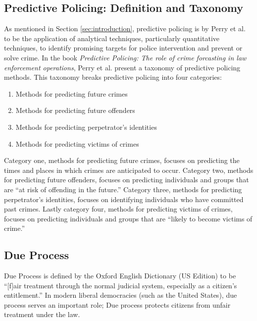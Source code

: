 \documentclass[12pt]{article} %
\newcommand{\hlfixme}[1]{\fxfatal{\hl{#1}}}
\begin{document}
\subsection{Predictive Policing: Definition and Taxonomy} \label{subsec:predictivepolicing}%

As mentioned in Section \ref{sec:introduction}, predictive policing is by Perry et al. to be the application of analytical techniques, particularly quantitative techniques, to identify promising targets for police intervention and prevent or solve crime. In the book \textit{Predictive Policing: The role of crime forcasting in law enforcement operations}, Perry et al. present a taxonomy of predictive policing methods. This taxonomy breaks predictive policing into four categories: \cite{perryetal}

\begin{enumerate}
\item Methods for predicting future crimes
\item Methods for predicting future offenders
\item Methods for predicting perpetrator's identities
\item Methods for predicting victims of crimes
\end{enumerate}

Category one, methods for predicting future crimes, focuses on predicting the times and places in which crimes are anticipated to occur. Category two, methods for predicting future offenders, focuses on predicting individuals and groups that are ``at risk of offending in the future.'' Category three, methods for predicting perpetrator's identities, focuses on identifying individuals who have committed past crimes. Lastly category four, methods for predicting victims of crimes, focuses on predicting individuals and groups that are ``likely to become victims of crime.''

%
%
%
%

\subsection{Due Process} \label{subsec:dueprocess}
Due Process is defined by the Oxford English Dictionary (US Edition) to be ``[f]air treatment through the normal judicial system, especially as a citizen’s entitlement.'' In modern liberal democracies (such as the United States), due process serves an important role; Due process protects citizens from unfair treatment under the law. 
\end{document}
